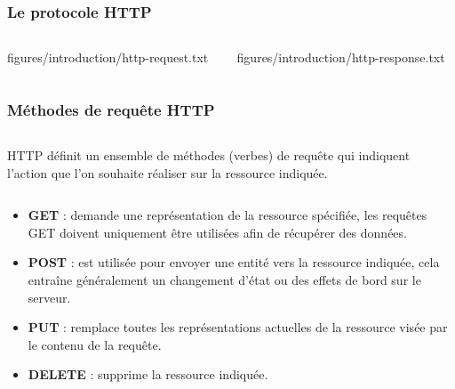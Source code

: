 \begin{frame}
    \frametitle{Le protocole HTTP}

    \begin{columns}
        \begin{column}{0.5\textwidth}
            
            {figures/introduction/http-request.txt}
        \end{column}

        \begin{column}{0.5\textwidth}
            
            {figures/introduction/http-response.txt}
        \end{column}
    \end{columns}
\end{frame}

\begin{frame}
    \frametitle{Méthodes de requête HTTP}

    \begin{columns}
        \begin{column}{0.8\textwidth}
            HTTP définit un ensemble de méthodes (verbes) de requête qui indiquent l'action que l'on souhaite réaliser sur la ressource indiquée.
        \end{column}
        \begin{column}{0.2\textwidth}

        \end{column}
    \end{columns}

    \begin{itemize}
        \item \textbf{GET} : demande une représentation de la ressource spécifiée, les requêtes GET doivent uniquement être utilisées afin de récupérer des données.
        \item \textbf{POST} : est utilisée pour envoyer une entité vers la ressource indiquée, cela entraîne généralement un changement d'état ou des effets de bord sur le serveur.
        \item \textbf{PUT} : remplace toutes les représentations actuelles de la ressource visée par le contenu de la requête.
        \item \textbf{DELETE} : supprime la ressource indiquée.
    \end{itemize}
\end{frame}


